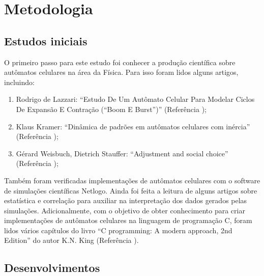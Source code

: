 \documentclass[11pt,a4paper,twocolumn,final]{article}
\begin{document}
\section*{Metodologia}

\subsection*{Estudos iniciais}

O primeiro passo para este estudo foi conhecer a produção científica sobre autômatos celulares na área da Física. Para isso foram lidos alguns artigos, incluindo:
\begin{enumerate}
    \item Rodrigo de Lazzari: “Estudo De Um Autômato Celular Para Modelar Ciclos De Expansão E Contração (“Boom E Burst”)” (Referência \cite{lazzari});
    \item Klaus Kramer: “Dinâmica de padrões em autômatos celulares com inércia” (Referência \cite{klaus});
    \item Gérard Weisbuch, Dietrich Stauffer: “Adjustment and social choice” (Referência \cite{stauffer});
\end{enumerate}
Também foram verificadas implementações de autômatos celulares  com o software de simulações científicas Netlogo. Ainda foi feita a leitura de alguns artigos sobre estatística e correlação para auxiliar na interpretação dos dados gerados pelas simulações. Adicionalmente, com o objetivo de obter conhecimento para criar implementações de autômatos celulares na linguagem de programação C, foram  lidos vários capítulos do livro “C programming: A modern approach, 2nd Edition” do autor K.N. King (Referência \cite{king}).
    
\subsection*{Desenvolvimentos}
\end{document}
